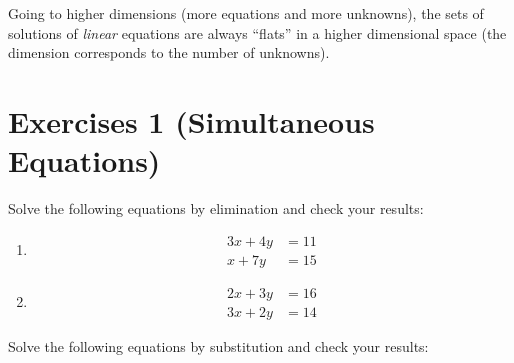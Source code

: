 \documentclass[
  12pt,
  oneside]{book}
\theoremstyle{definition}
\theoremstyle{definition}
\theoremstyle{definition}
\theoremstyle{definition}
\theoremstyle{remark}
\begin{document}
Going to higher dimensions (more equations and more unknowns), the sets of solutions of \emph{linear} equations are always ``flats'' in a higher dimensional space (the dimension corresponds to the number of unknowns).

\chapter*{Exercises 1 (Simultaneous Equations)}\label{exercises-1-simultaneous-equations}

Solve the following equations by elimination and check your results:

\begin{enumerate}
\def\labelenumi{\arabic{enumi}.}
\item
  \begin{align*}
  3x+4y &= 11\\
  x+7y  &= 15
  \end{align*}
\item
  \begin{align*}
  2x+3y &= 16\\
  3x+2y &= 14
  \end{align*}
\end{enumerate}

Solve the following equations by substitution and check your results:
\end{document}
